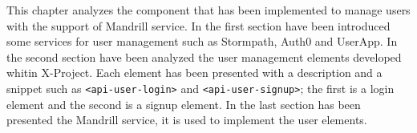 This chapter analyzes the component that has been implemented to manage users with the support of Mandrill service.
In the first section have been introduced some services for user management such as Stormpath, Auth0 and UserApp.
In the second section have been analyzed the user management elements developed whitin X-Project. Each element has been presented with a description and a snippet such as \texttt{<api-user-login>} and 
\texttt{<api-user-signup>}; the first is a login element and the second is a signup element.
In the last section has been presented the Mandrill service, it is used to implement the user elements. 